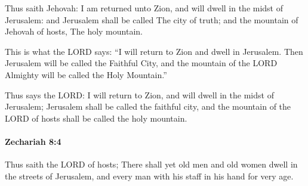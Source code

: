 			\begin{versebox}
					\item[BHS] 
					\item[LXX] 
					\item[ASV] Thus saith Jehovah: I am returned unto Zion, and will dwell in the midst of Jerusalem: and Jerusalem shall be called The city of truth; and the mountain of Jehovah of hosts, The holy mountain.
					\item[NIV] This is what the LORD says: “I will return to Zion and dwell in Jerusalem. Then Jerusalem will be called the Faithful City, and the mountain of the LORD Almighty will be called the Holy Mountain.”
					\item[NRSV] Thus says the LORD: I will return to Zion, and will dwell in the midst of Jerusalem; Jerusalem shall be called the faithful city, and the mountain of the LORD of hosts shall be called the holy mountain.
			\end{versebox}

		\paragraph{Zechariah 8:4} %
			\label{ZECHARIAH-8-4}

			Thus saith the LORD of hosts; There shall yet old men and old women dwell in the streets of Jerusalem, and every man with his staff in his hand for very age.

